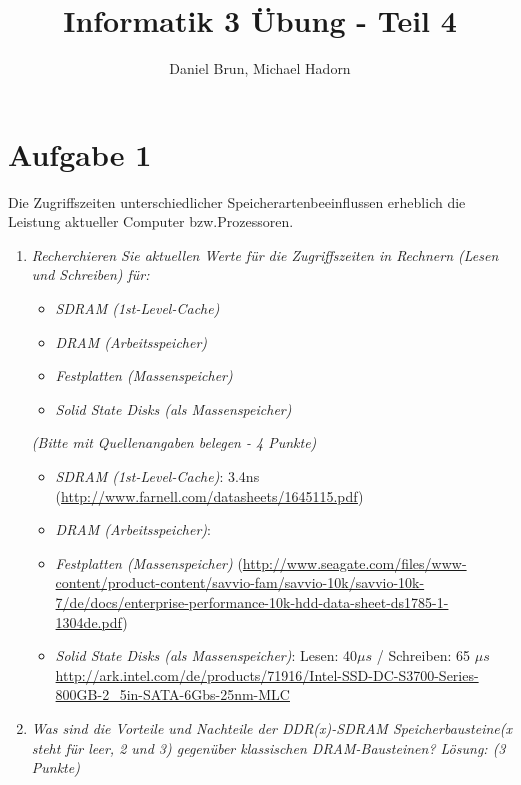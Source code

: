 \documentclass[10pt]{article}
\title{Informatik 3 Übung - Teil 4\vspace{-2ex}}
\author{Daniel Brun, Michael Hadorn\vspace{-2ex}}
\begin{document}
\maketitle

\section*{Aufgabe 1}
Die Zugriffszeiten unterschiedlicher Speicherartenbeeinflussen erheblich die Leistung aktueller Computer bzw.Prozessoren.
\begin{enumerate}[label=\alph*)]
	\item
		\textit{Recherchieren Sie aktuellen Werte für die Zugriffszeiten in Rechnern (Lesen und Schreiben) für:}
		\begin{itemize}
			\item \textit{SDRAM (1st-Level-Cache)}
			\item \textit{DRAM (Arbeitsspeicher)}
			\item \textit{Festplatten (Massenspeicher)}
			\item \textit{Solid State Disks (als Massenspeicher)}
		\end{itemize}
		\textit{(Bitte mit Quellenangaben belegen - 4 Punkte)}
		
		\begin{itemize}
			\item \textit{SDRAM (1st-Level-Cache)}: 3.4ns (\url{http://www.farnell.com/datasheets/1645115.pdf})
			\item \textit{DRAM (Arbeitsspeicher)}:  %
			\item \textit{Festplatten (Massenspeicher)} (\url{http://www.seagate.com/files/www-content/product-content/savvio-fam/savvio-10k/savvio-10k-7/de/docs/enterprise-performance-10k-hdd-data-sheet-ds1785-1-1304de.pdf})
			\item \textit{Solid State Disks (als Massenspeicher)}: Lesen: 40$\mu s$ / Schreiben: 65 $\mu s$ \url{http://ark.intel.com/de/products/71916/Intel-SSD-DC-S3700-Series-800GB-2_5in-SATA-6Gbs-25nm-MLC}
		\end{itemize}
		\item 
			\textit{Was sind die Vorteile und Nachteile der DDR(x)-SDRAM Speicherbausteine(x steht für leer, 2 und 3) gegenüber klassischen DRAM-Bausteinen? Lösung: (3 Punkte)}
		

\end{enumerate}
\end{document}
